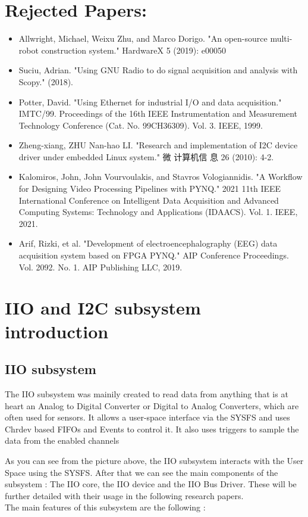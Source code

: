 \documentclass[l2pt, letterpaper]{article}
\begin{document}
\section{Rejected Papers:}
\begin{itemize}
    \item Allwright, Michael, Weixu Zhu, and Marco Dorigo. "An open-source multi-robot construction
system." HardwareX 5 (2019): e00050
    \item Suciu, Adrian. "Using GNU Radio to do signal acquisition and analysis with Scopy." (2018).
    \item Potter, David. "Using Ethernet for industrial I/O and data acquisition." IMTC/99. Proceedings
of the 16th IEEE Instrumentation and Measurement Technology Conference (Cat. No.
99CH36309). Vol. 3. IEEE, 1999.
    \item Zheng-xiang, ZHU Nan-hao LI. "Research and implementation of I2C device driver under
embedded Linux system." 微 计算机信 息 26 (2010): 4-2.
    \item Kalomiros, John, John Vourvoulakis, and Stavros Vologiannidis. "A Workflow for Designing
Video Processing Pipelines with PYNQ." 2021 11th IEEE International Conference on
Intelligent Data Acquisition and Advanced Computing Systems: Technology and Applications
(IDAACS). Vol. 1. IEEE, 2021.
    \item Arif, Rizki, et al. "Development of electroencephalography (EEG) data acquisition system
based on FPGA PYNQ." AIP Conference Proceedings. Vol. 2092. No. 1. AIP Publishing LLC,
2019.
\end{itemize}





\newpage
\section{IIO and I2C subsystem introduction}
\subsection{IIO subsystem}

The IIO subsystem was mainily created to read data from anything that is at
heart an Analog to Digital Converter or Digital to Analog Converters, which are
often used for sensors. It allows a user-space interface via the SYSFS and uses
Chrdev based FIFOs and Events to control it. It also uses triggers to sample the
data from the enabled channels

As you can see from the picture above, the IIO subsystem interacts with the User
Space using the SYSFS. After that we can see the main components of the
subsystem : The IIO core, the IIO device and the IIO Bus Driver. These will be
further detailed with their usage in the following research papers.\\
The main features of this subsystem are the following :
\end{document}
